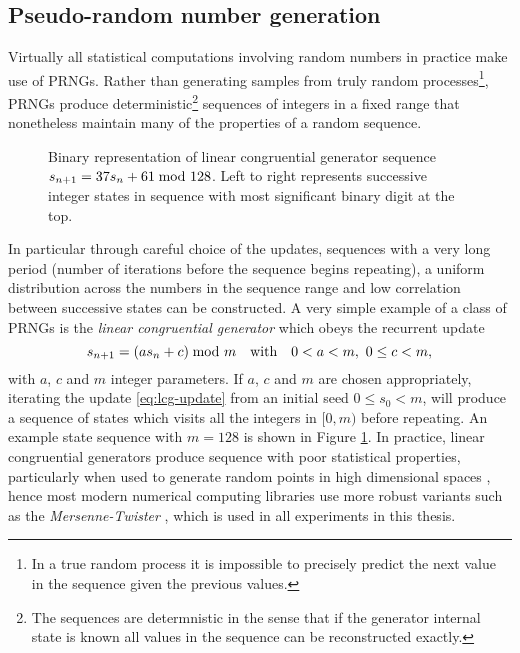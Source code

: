 \subsection{Pseudo-random number generation}

Virtually all statistical computations involving random numbers in practice make use of \acp{PRNG}. Rather than generating samples from truly random processes\footnote{In a true random process it is impossible to precisely predict the next value in the sequence given the previous values.}, \acp{PRNG} produce deterministic\footnote{The sequences are determnistic in the sense that if the generator internal state is known all values in the sequence can be reconstructed exactly.} sequences of integers in a fixed range that nonetheless maintain many of the properties of a random sequence. 

\begin{figure}[!t]
\centering
{}
\drawgrid[zero color=black!80, one color=Maroon, cell ht=0.22em, cell wd=0.22em]{\lcgfile}
\caption[Example linear congruential generator sequence.]{Binary representation of linear congruential generator sequence $s_{n+1} = 37s_n + 61 \kern-4pt\mod 128$. Left to right represents successive integer states in sequence with most significant binary digit at the top.}
\label{fig:example-lcg-sequence}
\end{figure}

In particular through careful choice of the updates, sequences with a very long period (number of iterations before the sequence begins repeating), a uniform distribution across the numbers in the sequence range and low correlation between successive states can be constructed. A very simple example of a class of \acp{PRNG} is the \emph{linear congruential generator} which obeys the recurrent update
\begin{equation}\label{eq:lcg-update}
  s_{n+1} = (a s_n + c) \kern-4pt\mod m
  \quad \textrm{with} \quad
   0 < a < m,~ 0 \leq c < m,
\end{equation}
with $a$, $c$ and $m$ integer parameters. If $a$, $c$ and $m$ are chosen appropriately, iterating the update \eqref{eq:lcg-update} from an initial seed $0 \leq s_0 < m$, will produce a sequence of states which visits all the integers in $[0, m)$ before repeating. An example state sequence with $m=128$ is shown in Figure \ref{fig:example-lcg-sequence}. In practice, linear congruential generators produce sequence with poor statistical properties, particularly when used to generate random points in high dimensional spaces \citep{marsaglia1968random}, hence most modern numerical computing libraries use more robust variants such as the \emph{Mersenne-Twister} \citep{matsumoto1998mersenne}, which is used in all experiments in this thesis.

